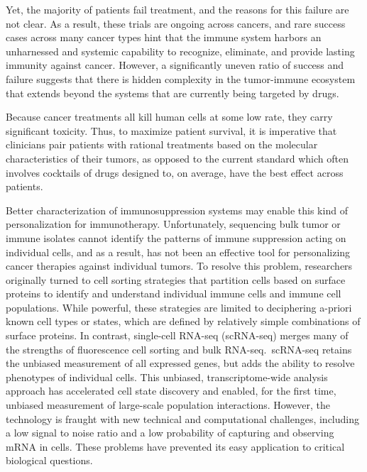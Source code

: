 Yet, the majority of patients fail treatment, and the reasons for this failure are not clear.  
As a result, these trials are ongoing across cancers, and rare success cases across many cancer types hint that the immune system harbors an unharnessed and systemic capability to recognize, eliminate, and provide lasting immunity against cancer.
However, a significantly uneven ratio of success and failure suggests that there is hidden complexity in the tumor-immune ecosystem that extends beyond the systems that are currently being targeted by drugs.

Because cancer treatments all kill human cells at some low rate, they carry significant toxicity. 
Thus, to maximize patient survival, it is imperative that clinicians pair patients with rational treatments based on the molecular characteristics of their tumors, as opposed to the current standard which often involves cocktails of drugs designed to, on average, have the best effect across patients. 

Better characterization of immunosuppression systems may enable this kind of personalization for immunotherapy. 
Unfortunately, sequencing bulk tumor or immune isolates cannot identify the patterns of immune suppression acting on individual cells, and as a result, has not been an effective tool for personalizing cancer therapies against individual tumors.  
To resolve this problem, researchers originally turned to cell sorting strategies that partition cells based on surface proteins to identify and understand individual immune cells and immune cell populations.
While powerful, these strategies are limited to deciphering a-priori known cell types or states, which are defined by relatively simple combinations of surface proteins.
In contrast, single-cell RNA-seq (scRNA-seq) merges many of the strengths of fluorescence cell sorting and bulk RNA-seq.\ 
scRNA-seq retains the unbiased measurement of all expressed genes, but adds the ability to resolve phenotypes of individual cells.
This unbiased, transcriptome-wide analysis approach has accelerated cell state discovery and enabled, for the first time, unbiased measurement of large-scale population interactions.
However, the technology is fraught with new technical and computational challenges, including a low signal to noise ratio and a low probability of capturing and observing mRNA in cells. 
These problems have prevented its easy application to critical biological questions.


